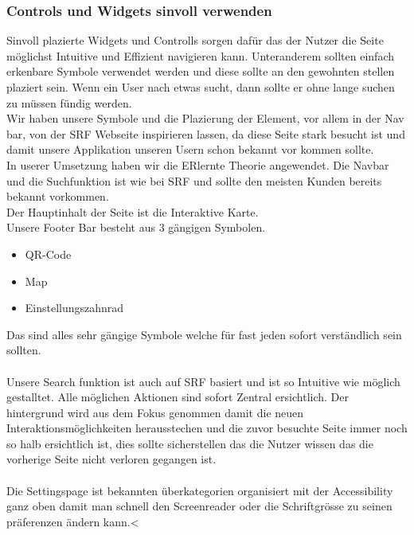 \documentclass[10pt]{article}
\newcounter{subsubsubsection}[subsubsection]
\begin{document}
	\subsubsection{Controls und Widgets sinvoll verwenden}
	Sinvoll plazierte Widgets und Controlls sorgen dafür das der Nutzer die Seite möglichst Intuitive und Effizient navigieren kann. Unteranderem sollten einfach erkenbare Symbole verwendet werden und diese sollte an den gewohnten stellen plaziert sein. Wenn ein User nach etwas sucht, dann sollte er ohne lange suchen zu müssen fündig werden.\\
	Wir haben unsere Symbole und die Plazierung der Element, vor allem in der Nav bar, von der SRF Webseite inspirieren lassen, da diese Seite stark besucht ist und damit unsere Applikation unseren Usern schon bekannt vor kommen sollte.
	\\
	In userer Umsetzung haben wir die ERlernte Theorie angewendet. Die Navbar und die Suchfunktion ist wie bei SRF und sollte den meisten Kunden bereits bekannt vorkommen.
	\\
	Der Hauptinhalt der Seite ist die Interaktive Karte.
	\\
	Unsere Footer Bar besteht aus 3 gängigen Symbolen.
	\begin{itemize}
		\item QR-Code
		\item Map
		\item Einstellungszahnrad
	\end{itemize}
	Das sind alles sehr gängige Symbole welche für fast jeden sofort verständlich sein sollten.\\\\
	Unsere Search funktion ist auch auf SRF basiert und ist so Intuitive wie möglich gestalltet. Alle möglichen Aktionen sind sofort Zentral ersichtlich. Der hintergrund wird aus dem Fokus genommen damit die neuen Interaktionsmöglichkeiten herausstechen und die zuvor besuchte Seite immer noch so halb ersichtlich ist, dies sollte sicherstellen das die Nutzer wissen das die vorherige Seite nicht verloren gegangen ist.\\\\
	Die Settingspage ist bekannten überkategorien organisiert mit der Accessibility ganz oben damit man schnell den Screenreader oder die Schriftgrösse zu seinen präferenzen ändern kann.<
	\\
\end{document}
